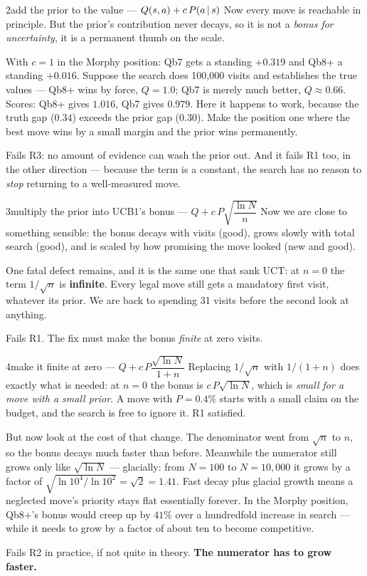 \begin{attempt}{2}{add the prior to the value --- $Q(s,a) + c\,P(a\,|\, s)$}
Now every move is reachable in principle. But the prior's contribution never decays, so it
is not a \emph{bonus for uncertainty}, it is a permanent thumb on the scale.

With $c = 1$ in the Morphy position: Qb7 gets a standing $+0.319$ and Qb8+ a standing
$+0.016$. Suppose the search does 100{,}000 visits and establishes the true values --- Qb8+
wins by force, $Q = 1.0$; Qb7 is merely much better, $Q \approx 0.66$. Scores: Qb8+ gives
$1.016$, Qb7 gives $0.979$. Here it happens to work, because the truth gap ($0.34$) exceeds
the prior gap ($0.30$). Make the position one where the best move wins by a small margin and
the prior wins permanently.

Fails R3: no amount of evidence can wash the prior out. And it fails R1 too, in the other
direction --- because the term is a constant, the search has no reason to \emph{stop}
returning to a well-measured move.
\end{attempt}

\begin{attempt}{3}{multiply the prior into UCB1's bonus ---
  $Q + c\,P\sqrt{\dfrac{\ln N}{n}}$}
Now we are close to something sensible: the bonus decays with visits (good), grows slowly
with total search (good), and is scaled by how promising the move looked (new and good).

One fatal defect remains, and it is the same one that sank UCT: at $n = 0$ the term
$1/\sqrt{n}$ is \textbf{infinite}. Every legal move still gets a mandatory first visit,
whatever its prior. We are back to spending 31 visits before the second look at anything.

Fails R1. The fix must make the bonus \emph{finite} at zero visits.
\end{attempt}

\begin{attempt}{4}{make it finite at zero --- $Q + c\,P\dfrac{\sqrt{\ln N}}{1+n}$}
Replacing $1/\sqrt{n}$ with $1/(1+n)$ does exactly what is needed: at $n=0$ the bonus is
$c\,P\sqrt{\ln N}$, which is \emph{small for a move with a small prior}. A move with
$P = 0.4\%$ starts with a small claim on the budget, and the search is free to ignore it.
R1 satisfied.

But now look at the cost of that change. The denominator went from $\sqrt{n}$ to $n$, so the
bonus decays much faster than before. Meanwhile the numerator still grows only like
$\sqrt{\ln N}$ --- glacially: from $N = 100$ to $N = 10{,}000$ it grows by a factor of
$\sqrt{\ln 10^4/\ln 10^2} = \sqrt{2} = 1.41$. Fast decay plus glacial growth means a
neglected move's priority stays flat essentially forever. In the Morphy position, Qb8+'s
bonus would creep up by $41\%$ over a hundredfold increase in search --- while it needs to
grow by a factor of about ten to become competitive.

Fails R2 in practice, if not quite in theory. \textbf{The numerator has to grow faster.}
\end{attempt}

